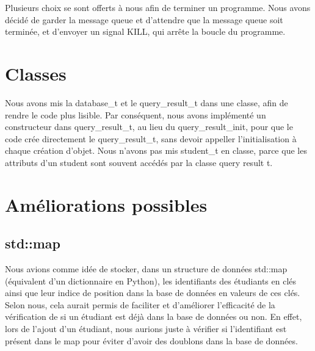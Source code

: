 \documentclass[utf8]{article}
\begin{document}
Plusieurs choix se sont offerts à nous afin de terminer un programme. Nous avons décidé de garder la message queue 
et d'attendre que la message queue soit terminée, et d'envoyer un signal KILL, qui arrête la boucle du programme.


\section{Classes}

Nous avons mis la database\_t et le query\_result\_t dans une classe, afin de rendre le code plus lisible. Par conséquent,
nous avons implémenté un constructeur dans query\_result\_t, au lieu du query\_result\_init, pour que le code
crée directement le query\_result\_t, sans devoir appeller l'initialisation à chaque création d'objet.
Nous n'avons pas mis student\_t en classe, parce que les attributs d'un student sont souvent accédés par la classe query result t.
\section{Améliorations possibles}
    \subsection{std::map}
    Nous avions comme idée de stocker, dans un structure de données std::map (équivalent d'un dictionnaire en Python), les identifiants des étudiants en clés ainsi que leur indice de position dans la base de données en valeurs de ces clés. \newline
    Selon nous, cela aurait permis de faciliter et d'améliorer l'efficacité de la vérification de si un étudiant est déjà dans la base de données ou non. \newline En effet, lors de l'ajout d'un étudiant, nous aurions juste à vérifier si l'identifiant est présent dans le map pour éviter d'avoir des doublons dans la base de données.
\end{document}
